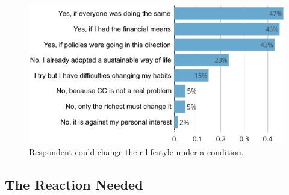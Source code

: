 \documentclass[english,5p,authoryear]{elsarticle}
\begin{document}
    

\begin{figure}[t]
\centering
\includegraphics[width=\columnwidth]{Images/change_if_no.png}
\caption{Respondent could change their lifestyle under a condition.}
\label{fig:condition}
\end{figure}

    \subsection{The Reaction Needed\label{subsec:reaction}}
    
\end{document}

